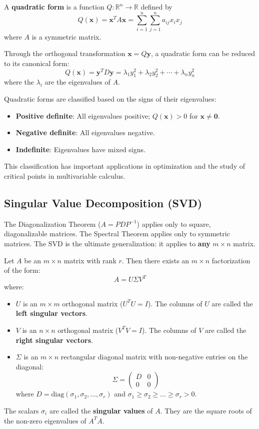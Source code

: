 \begin{definition}
A \textbf{quadratic form} is a function $Q: \mathbb{R}^n \to \mathbb{R}$ defined by
\[
Q(\mathbf{x}) = \mathbf{x}^T A \mathbf{x} = \sum_{i=1}^n \sum_{j=1}^n a_{ij} x_i x_j
\]
where $A$ is a symmetric matrix.
\end{definition}

Through the orthogonal transformation $\mathbf{x} = Q\mathbf{y}$, a quadratic form can be reduced to its canonical form:
\[
Q(\mathbf{x}) = \mathbf{y}^T D \mathbf{y} = \lambda_1 y_1^2 + \lambda_2 y_2^2 + \cdots + \lambda_n y_n^2
\]
where the $\lambda_i$ are the eigenvalues of $A$.

Quadratic forms are classified based on the signs of their eigenvalues:
\begin{itemize}
    \item \textbf{Positive definite}: All eigenvalues positive; $Q(\mathbf{x}) > 0$ for $\mathbf{x} \neq \mathbf{0}$.
    \item \textbf{Negative definite}: All eigenvalues negative.
    \item \textbf{Indefinite}: Eigenvalues have mixed signs.
\end{itemize}

This classification has important applications in optimization and the study of critical points in multivariable calculus.


\subsection{Singular Value Decomposition (SVD)}
The Diagonalization Theorem ($A = PDP^{-1}$) applies only to square, diagonalizable matrices. The Spectral Theorem applies only to symmetric matrices. The SVD is the ultimate generalization: it applies to \textbf{any} $m \times n$ matrix.

\begin{theorem}
Let $A$ be an $m \times n$ matrix with rank $r$. Then there exists an $m \times n$ factorization of the form:
\[ A = U \Sigma V^T \]
where:
\begin{itemize}
    \item $U$ is an $m \times m$ orthogonal matrix ($U^T U = I$). The columns of $U$ are called the \textbf{left singular vectors}.
    \item $V$ is an $n \times n$ orthogonal matrix ($V^T V = I$). The columns of $V$ are called the \textbf{right singular vectors}.
    \item $\Sigma$ is an $m \times n$ rectangular diagonal matrix with non-negative entries on the diagonal:
    \[ \Sigma = \begin{pmatrix} D & 0 \\ 0 & 0 \end{pmatrix} \]
    where $D = \text{diag}(\sigma_1, \sigma_2, \dots, \sigma_r)$ and $\sigma_1 \ge \sigma_2 \ge \dots \ge \sigma_r > 0$.
\end{itemize}
The scalars $\sigma_i$ are called the \textbf{singular values} of $A$. They are the square roots of the non-zero eigenvalues of $A^T A$.
\end{theorem}

